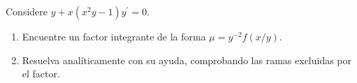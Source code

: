 Considere $y+x(x^2y-1)y^{\prime}=0$.

\begin{enumerate}[label=(\alph*),ref=\alph*,leftmargin=*]
\item Encuentre un factor integrante de la forma $\mu=y^{-2}f(x/y)$.
\item Resuelva analíticamente con su ayuda, comprobando las ramas excluidas por el factor.
\end{enumerate}
